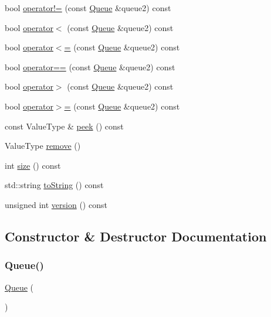 \begin{DoxyCompactItemize}
\item 
bool \mbox{\hyperlink{classQueue_a385dafd253f98c0a2cec02b5c077cc2e}{operator!=}} (const \mbox{\hyperlink{classQueue}{Queue}} \&queue2) const
\item 
bool \mbox{\hyperlink{classQueue_ad2043e6acdbba5a438b040a2ceda3db7}{operator$<$}} (const \mbox{\hyperlink{classQueue}{Queue}} \&queue2) const
\item 
bool \mbox{\hyperlink{classQueue_aea83f9b16703e7b7a1e46e0746f608c0}{operator$<$=}} (const \mbox{\hyperlink{classQueue}{Queue}} \&queue2) const
\item 
bool \mbox{\hyperlink{classQueue_a85514d93aa9c51e072e2f16ed37ee889}{operator==}} (const \mbox{\hyperlink{classQueue}{Queue}} \&queue2) const
\item 
bool \mbox{\hyperlink{classQueue_afb42a4f29f0857da53e102eb8f77eea6}{operator$>$}} (const \mbox{\hyperlink{classQueue}{Queue}} \&queue2) const
\item 
bool \mbox{\hyperlink{classQueue_ad18096c65e1e4666a4103b559d2c2acd}{operator$>$=}} (const \mbox{\hyperlink{classQueue}{Queue}} \&queue2) const
\item 
const Value\+Type \& \mbox{\hyperlink{classQueue_a74501ededf728c31068dd28a70a8a1f2}{peek}} () const
\item 
Value\+Type \mbox{\hyperlink{classQueue_a025ec97fa5b04552f5ad0902c1f02ac1}{remove}} ()
\item 
int \mbox{\hyperlink{classQueue_af9593d4a5ff4274efaf429cb4f9e57cc}{size}} () const
\item 
std\+::string \mbox{\hyperlink{classQueue_a1fe5121d6528fdea3f243321b3fa3a49}{to\+String}} () const
\item 
unsigned int \mbox{\hyperlink{classQueue_a0aa696ccb72cbf928535d6b646bac1aa}{version}} () const
\end{DoxyCompactItemize}


\subsection{Constructor \& Destructor Documentation}
\mbox{\label{classQueue_a9419268280646dc4ab7b01d6fa3741c8}} 
\subsubsection{\texorpdfstring{Queue()}{Queue()}\hspace{0.1cm}{\footnotesize\ttfamily [1/2]}}
{\footnotesize\ttfamily \mbox{\hyperlink{classQueue}{Queue}} (\begin{DoxyParamCaption}{ }\end{DoxyParamCaption})}


